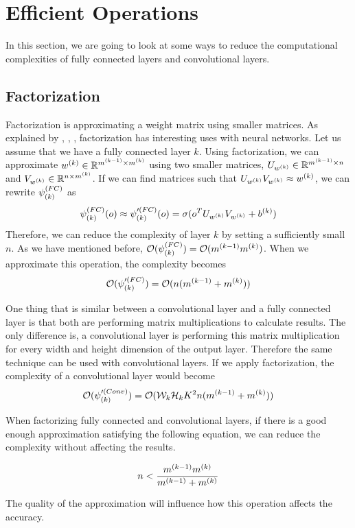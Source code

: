 \section{Efficient Operations}
In this section, we are going to look at some ways to reduce the computational complexities of fully connected layers and convolutional layers. 

\subsection{Factorization}
Factorization is approximating a weight matrix using smaller matrices. As explained by \cite{zhang2016accelerating}, \cite{denton2014exploiting}, \cite{chung2016simplifying}, factorization has interesting uses with neural networks. Let us assume that we have a fully connected layer $k$. Using factorization, we can approximate $w^{(k)} \in \mathbb{R}^{m^{(k-1)} \times m^{(k)}}$ using two smaller matrices, $U_{w^{(k)}} \in \mathbb{R}^{m^{(k-1)} \times n}$ and $V_{w^{(k)}} \in \mathbb{R}^{n \times m^{(k)}}$. If we can find matrices such that $U_{w^{(k)}}V_{w^{(k)}} \approx w^{(k)}$, we can rewrite $\psi^{(FC)}_{(k)}$ as
$$\psi^{(FC)}_{(k)}(o) \approx \psi'^{(FC)}_{(k)}(o) = \sigma(o^T U_{w^{(k)}}V_{w^{(k)}} +b^{(k)})$$
Therefore, we can reduce the complexity of layer $k$ by setting a sufficiently small $n$. As we have mentioned before, $\mathcal{O}(\psi^{(FC)}_{(k)}) = \mathcal{O}(m^{(k-1)}m^{(k)})$. When we approximate this operation, the complexity becomes
$$\mathcal{O}(\psi'^{(FC)}_{(k)}) = \mathcal{O}(n(m^{(k-1)}+m^{(k)}))$$

One thing that is similar between a convolutional layer and a fully connected layer is that both are performing matrix multiplications to calculate results. The only difference is, a convolutional layer is performing this matrix multiplication for every width and height dimension of the output layer. Therefore the same technique can be used with convolutional layers. If we apply factorization, the complexity of a convolutional layer would become
$$ \mathcal{O}(\psi'^{(Conv)}_{(k)}) =  \mathcal{O}(\mathcal{W}_{k}\mathcal{H}_{k}K^2n(m^{(k-1)}+m^{(k)})) $$

When factorizing fully connected and convolutional layers, if there is a good enough approximation satisfying the following equation, we can reduce the complexity without affecting the results.

\begin{equation}
\label{eq:small_n}
n < \frac{m^{(k-1)}m^{(k)}}{m^{(k-1)}+m^{(k)}}
\end{equation}

The quality of the approximation will influence how this operation affects the accuracy.

